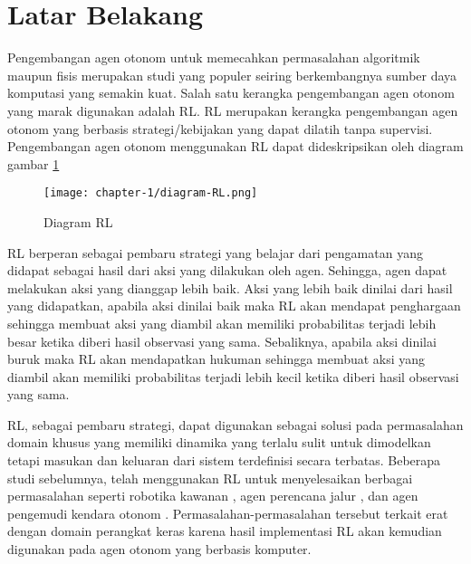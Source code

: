 \section{Latar Belakang}

Pengembangan agen otonom untuk memecahkan permasalahan algoritmik maupun fisis merupakan studi yang populer seiring berkembangnya sumber daya komputasi yang semakin kuat. Salah satu kerangka pengembangan agen otonom yang marak digunakan adalah \acf{RL}. \ac{RL} merupakan kerangka pengembangan agen otonom yang berbasis strategi/kebijakan yang dapat dilatih tanpa supervisi. Pengembangan agen otonom menggunakan \ac{RL} dapat dideskripsikan oleh diagram gambar \ref{fig:RL-diagram}

\begin{figure}[h]
	\centering
	\texttt{[image: chapter-1/diagram-RL.png]}
	\caption{Diagram \acl{RL}}
	\label{fig:RL-diagram}
\end{figure}

\ac{RL} berperan sebagai pembaru strategi yang belajar dari pengamatan yang didapat sebagai hasil dari aksi yang dilakukan oleh agen. Sehingga, agen dapat melakukan aksi yang dianggap lebih baik. Aksi yang lebih baik dinilai dari hasil yang didapatkan, apabila aksi dinilai baik maka \ac{RL} akan mendapat penghargaan sehingga membuat aksi yang diambil akan memiliki probabilitas terjadi lebih besar ketika diberi hasil observasi yang sama. Sebaliknya, apabila aksi dinilai buruk maka \ac{RL} akan mendapatkan hukuman sehingga membuat aksi yang diambil akan memiliki probabilitas terjadi lebih kecil ketika diberi hasil observasi yang sama.

\ac{RL}, sebagai pembaru strategi, dapat digunakan sebagai solusi pada permasalahan domain khusus yang memiliki dinamika yang terlalu sulit untuk dimodelkan tetapi masukan dan keluaran dari sistem terdefinisi secara terbatas. Beberapa studi sebelumnya, telah menggunakan RL untuk menyelesaikan berbagai permasalahan seperti robotika kawanan \parencite{hubert2022perancangan}, agen perencana jalur \parencite{dawne2023algoritma}, dan agen pengemudi kendara otonom \parencite{mardhatillah2023strategi}. Permasalahan-permasalahan tersebut terkait erat dengan domain perangkat keras karena hasil implementasi RL akan kemudian digunakan pada agen otonom yang berbasis komputer.

